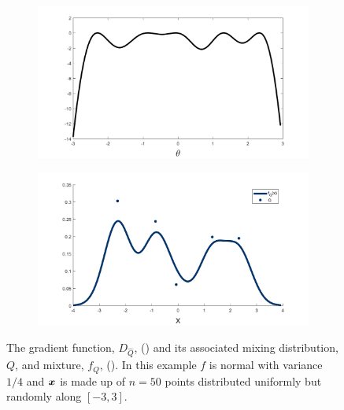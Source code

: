 	\begin{figure}[ht]
		\begin{subfigure}[t]{0.49\textwidth}
			\centering
			\includegraphics[width = \textwidth]{Figures/Mixtures/D_Q_example.png}
			\caption{}\label{subfig:D_Q}
		\end{subfigure}
		\begin{subfigure}[t]{0.49\textwidth}
			\centering
			\includegraphics[width = \textwidth]{Figures/Mixtures/D_Q_example_mixture.png}
			\caption{}\label{subfig:D_Qmixture}
		\end{subfigure}
		\caption[The gradient function and its associated mixing distribution and mixture.]{The gradient function, $D_{\hat{Q}}$, () and its associated mixing distribution, $Q$, and mixture, $f_Q$, (). In this example $f$ is normal with variance $1/4$ and ${\bm{{x}}}$ is made up of $n = 50$ points distributed uniformly but randomly along $[-3, 3]$.}
		\label{fig:D_Q example}
	\end{figure}

